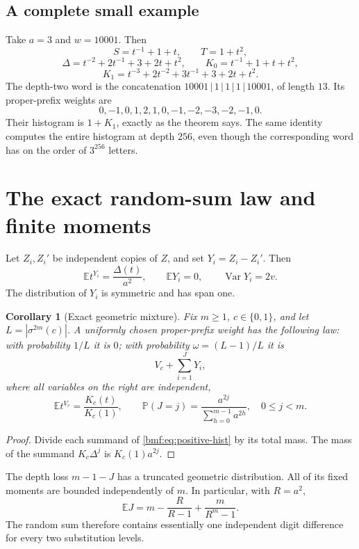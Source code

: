 \documentclass[11pt]{article}
\numberwithin{equation}{section}
\newtheorem{corollary}[theorem]{Corollary}
\theoremstyle{definition}
\theoremstyle{remark}
\newcommand{\E}{\mathbb E}
\newcommand{\Prob}{\mathbb P}
\newcommand{\Var}{\operatorname{Var}}
\begin{document}
\subsection{A complete small example}

Take $a=3$ and $w=10001$. Then
\[
 S=t^{-1}+1+t,\qquad T=1+t^2,
\]
\[
 \Delta=t^{-2}+2t^{-1}+3+2t+t^2,\qquad
 K_0=t^{-1}+1+t+t^2,
\]
\begin{equation}\label{bmf:eq:a3K}
 K_1=t^{-3}+2t^{-2}+3t^{-1}+3+2t+t^2.
\end{equation}
The depth-two word is the concatenation
$10001\,|\,1\,|\,1\,|\,1\,|\,10001$, of length $13$.
Its proper-prefix weights are
\[
 0,-1,0,1,2,1,0,-1,-2,-3,-2,-1,0.
\]
Their histogram is $1+K_1$, exactly as the theorem says. The same
identity computes the entire histogram at depth $256$, even though
the corresponding word has on the order of $3^{256}$ letters.

\section{The exact random-sum law and finite moments}\label{bmf:sec:mixture}

Let $Z_i,Z_i'$ be independent copies of $Z$, and set
$Y_i=Z_i-Z_i'$. Then
\begin{equation}\label{bmf:eq:digit-law}
 \E t^{Y_i}=\frac{\Delta(t)}{a^2},\qquad
 \E Y_i=0,\qquad \Var Y_i=2v.
\end{equation}
The distribution of $Y_i$ is symmetric and has span one.

\begin{corollary}[Exact geometric mixture]\label{bmf:cor:mixture}
Fix $m\geq1$, $c\in\{0,1\}$, and let $L=|\sigma^{2m}(c)|$.
A uniformly chosen proper-prefix weight has the following law:
with probability $1/L$ it is $0$; with probability
$\omega=(L-1)/L$ it is
\begin{equation}\label{bmf:eq:mixture-law}
 V_c+\sum_{i=1}^{J}Y_i,
\end{equation}
where all variables on the right are independent,
\[
 \E t^{V_c}=\frac{K_c(t)}{K_c(1)},\qquad
 \Prob(J=j)=\frac{a^{2j}}{\sum_{h=0}^{m-1}a^{2h}},
 \quad 0\leq j<m.
\]
\end{corollary}
\begin{proof}
Divide each summand of \eqref{bmf:eq:positive-hist} by its total mass.
The mass of the summand $K_c\Delta^j$ is $K_c(1)a^{2j}$.
\end{proof}

The depth loss $m-1-J$ has a truncated geometric distribution.
All of its fixed moments are bounded independently of $m$.
In particular, with $R=a^2$,
\begin{equation}\label{bmf:eq:EJ}
 \E J=m-\frac{R}{R-1}+\frac{m}{R^m-1}.
\end{equation}
The random sum therefore contains essentially one independent
digit difference for every two substitution levels.
\end{document}
